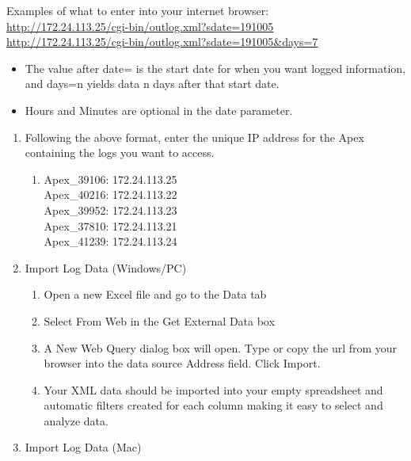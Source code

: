 \documentclass[]{book}
\providecommand{\tightlist}{%
  \setlength{\itemsep}{0pt}\setlength{\parskip}{0pt}}
\begin{document}
Examples of what to enter into your internet browser:\\
\url{http://172.24.113.25/cgi-bin/outlog.xml?sdate=191005}\\
\url{http://172.24.113.25/cgi-bin/outlog.xml?sdate=191005\&days=7}

\begin{itemize}
\tightlist
\item
  The value after date= is the start date for when you want logged
  information, and days=n yields data n days after that start date.
\item
  Hours and Minutes are optional in the date parameter.
\end{itemize}

\begin{enumerate}
\def\labelenumi{\arabic{enumi}.}
\tightlist
\item
  Following the above format, enter the unique IP address for the Apex
  containing the logs you want to access.

  \begin{enumerate}
  \def\labelenumii{\arabic{enumii}.}
  \tightlist
  \item
    Apex\_39106: 172.24.113.25\\
    Apex\_40216: 172.24.113.22\\
    Apex\_39952: 172.24.113.23\\
    Apex\_37810: 172.24.113.21\\
    Apex\_41239: 172.24.113.24\\
  \end{enumerate}
\item
  Import Log Data (Windows/PC)

  \begin{enumerate}
  \def\labelenumii{\arabic{enumii}.}
  \tightlist
  \item
    Open a new Excel file and go to the Data tab
  \item
    Select From Web in the Get External Data box
  \item
    A New Web Query dialog box will open. Type or copy the url from your
    browser into the data source Address field. Click Import.
  \item
    Your XML data should be imported into your empty spreadsheet and
    automatic filters created for each column making it easy to select
    and analyze data.
  \end{enumerate}
\item
  Import Log Data (Mac)


\end{enumerate}
\end{document}
